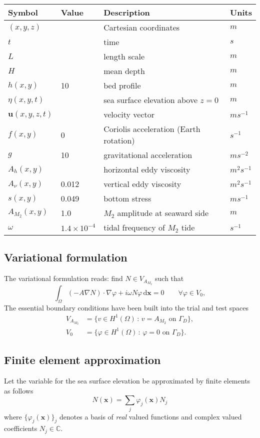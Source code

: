 \documentclass[11pt,a4paper]{article}
\begin{document}
\begin{center}
\begin{tabular}{|l|l|l|l|}
\hline
Symbol & Value & Description & Units\\
\hline
$(x,y,z)$ & & Cartesian coordinates & $m$\\
$t$ & & time & $s$\\
$L$ & & length scale & $m$\\
$H$ & & mean depth & $m$\\
$h(x,y)$ & 10 & bed profile & $m$\\
$\eta(x,y,t)$ & & sea surface elevation above $z=0$ & $m$\\
$\mathbf{u}(x,y,z,t)$ & & velocity vector & $m s^{-1}$\\
$f(x,y)$ & 0 & Coriolis acceleration (Earth rotation) & $s^{-1}$\\
$g$ & 10 & gravitational acceleration & $ms^{-2}$\\
$A_h(x,y)$ & & horizontal eddy viscosity & $m^2 s^{-1}$\\
$A_\nu(x,y)$ & 0.012 & vertical eddy viscosity & $m^2 s^{-1}$\\
$s(x,y)$ & 0.049 & bottom stress & $m s^{-1}$\\
$A_{M_2}(x,y)$ & 1.0 & $M_2$ amplitude at seaward side & $m$\\
$\omega$ & $1.4\times 10^{-4}$ &tidal frequency of $M_2$ tide & $s^{-1}$\\
\hline
\end{tabular}
\end{center}

\subsection{Variational formulation}
The variational formulation reads: find $N\in V_{A_{M_2}}$ such that
\begin{equation}
\int_\Omega(-A\nabla N)\cdot\nabla \varphi+ i\omega N \varphi\,\mathrm{d}\mathbf{x}=0\qquad \forall \varphi\in V_0,
\end{equation}
The essential boundary conditions have been built into the trial and test spaces
\begin{align}
V_{A_{M_2}}&=\{v\in H^1(\Omega)\,:\, v=A_{M_2}\text{ on }\Gamma_D\},\\
V_0&=\{\varphi\in H^1(\Omega)\,:\, \varphi=0\text{ on }\Gamma_D\}.
\end{align}

\subsection{Finite element approximation}
Let the variable for the sea surface elevation be approximated by finite elements as follows
\begin{equation}
N(\mathbf{x})=\sum_{j}\varphi_j(\mathbf{x})N_j 
\end{equation}
where $\{\varphi_j(\mathbf{x})\}_j$ denotes a basis of \emph{real} valued functions and complex valued coefficients $N_j\in\mathbb{C}$.
\end{document}
